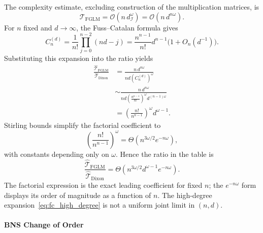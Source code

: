 The complexity estimate, excluding construction of the multiplication matrices, is
\[
\mathcal T_{\mathrm{FGLM}}
=\mathcal O(n\,d_{\mathcal I}^{\omega})
=\mathcal O(n\,d^{n\omega}).
\]
For $n$ fixed and $d\to\infty$, the Fuss--Catalan formula gives
\begin{equation}\label{eq:fc_high_degree}
C_n^{(d)}
=\frac1{n!}\prod_{j=0}^{n-2}(nd-j)
=\frac{n^{n-1}}{n!}d^{n-1}\bigl(1+O_n(d^{-1})\bigr).
\end{equation}
Substituting this expansion into the ratio yields
\begin{align*}
\frac{\widehat{\mathcal T}_{\mathrm{FGLM}}}{\widehat{\mathcal T}_{\mathrm{Dixon}}}
&=\frac{n\,d^{n\omega}}{nd\left(C_n^{(d)}\right)^\omega}\\
&\sim\frac{n\,d^{n\omega}}{nd\left(\frac{n^{n-1}}{n!}\right)^\omega d^{(n-1)\omega}}\\
&=\left(\frac{n!}{n^{n-1}}\right)^\omega d^{\omega-1}.
\end{align*}
Stirling bounds simplify the factorial coefficient to
\begin{equation}\label{eq:factorial_coefficient}
\left(\frac{n!}{n^{n-1}}\right)^\omega
=\Theta\!\left(n^{3\omega/2}e^{-n\omega}\right),
\end{equation}
with constants depending only on $\omega$. Hence the ratio in the table is
\[
\frac{\widehat{\mathcal T}_{\mathrm{FGLM}}}{\widehat{\mathcal T}_{\mathrm{Dixon}}}
=\Theta\!\left(n^{3\omega/2}d^{\omega-1}e^{-n\omega}\right).
\]
The factorial expression is the exact leading coefficient for fixed $n$; the $e^{-n\omega}$ form displays its order of magnitude as a function of $n$. The high-degree expansion~\eqref{eq:fc_high_degree} is not a uniform joint limit in $(n,d)$.

\paragraph{BNS Change of Order~\cite{BerthomieuNeigerSafey2022}}

